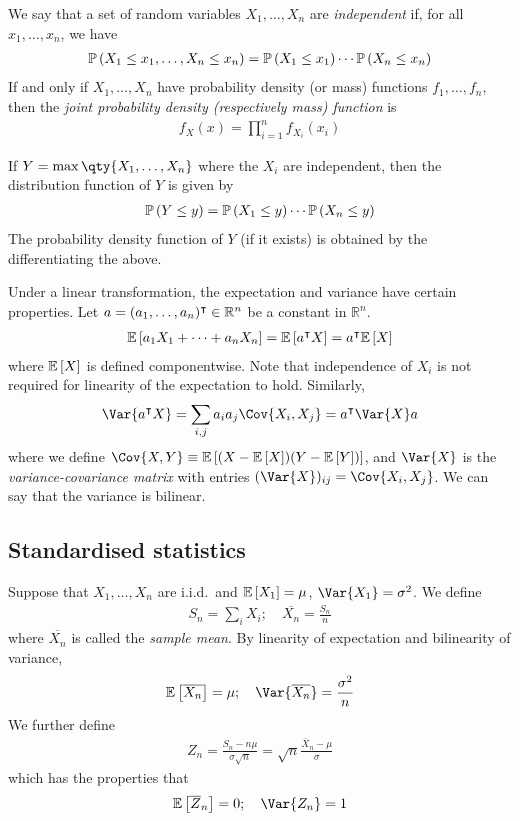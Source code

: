 We say that a set of random variables $X_1, \dots, X_n$ are \textit{independent} if, for all $x_1, \dots, x_n$, we have
\begin{align*}
	\mathbb{P}\left({X_1 \leq x_1, \dots, X_n \leq x_n}\right) = \mathbb{P}\left({X_1 \leq x_1}\right) \cdots \mathbb{P}\left({X_n \leq x_n}\right)
\end{align*}
If and only if $X_1, \dots, X_n$ have probability density (or mass) functions $f_1, \dots, f_n$, then the \textit{joint probability density (respectively mass) function} is
\begin{align*}
	f_X(x) = \prod_{i = 1}^n f_{X_i}(x_i)
\end{align*}

If $Y = \max\qty{X_1, \dots, X_n}$ where the $X_i$ are independent, then the distribution function of $Y$ is given by
\begin{align*}
	\mathbb{P}\left({Y \leq y}\right) = \mathbb{P}\left({X_1 \leq y}\right) \cdots \mathbb{P}\left({X_n \leq y}\right)
\end{align*}
The probability density function of $Y$ (if it exists) is obtained by the differentiating the above.

Under a linear transformation, the expectation and variance have certain properties.
Let $a = (a_1, \dots, a_n)^\intercal \in \mathbb R^n$ be a constant in $\mathbb R^n$.
\begin{align*}
	\mathbb{E}\left[{a_1 X_1 + \dots + a_n X_n}\right] = \mathbb{E}\left[{a^\intercal X}\right] = a^\intercal \mathbb{E}\left[{X}\right]
\end{align*}
where $\mathbb{E}\left[{X}\right]$ is defined componentwise.
Note that independence of $X_i$ is not required for linearity of the expectation to hold.
Similarly,
\begin{align*}
	\Var{a^\tran X} = \sum_{i,j} a_i a_j \Cov{X_i, X_j} = a^\tran \Var{X} a
\end{align*}
where we define $\Cov{X, Y} \equiv \expect{(X - \expect{X})(Y - \expect{Y})}$, and $\Var{X}$ is the \textit{variance-covariance matrix} with entries $(\Var{X})_{ij} = \Cov{X_i, X_j}$.
We can say that the variance is bilinear.

\subsection{Standardised statistics}
Suppose that $X_1, \dots, X_n$ are i.i.d.\ and $\mathbb{E}\left[{X_1}\right] = \mu$, $\Var{X_1} = \sigma^2$.
We define
\begin{align*}
	S_n = \sum_i X_i;\quad \overline{X_n} = \frac{S_n}{n}
\end{align*}
where $\overline{X_n}$ is called the \textit{sample mean}.
By linearity of expectation and bilinearity of variance,
\begin{align*}
	\expect{\overline{X_n}} = \mu;\quad \Var{\overline {X_n}} = \frac{\sigma^2}{n}
\end{align*}
We further define
\begin{align*}
	Z_n = \frac{S_n - n\mu}{\sigma\sqrt{n}} = \sqrt{n} \frac{\overline X_n - \mu}{\sigma}
\end{align*}
which has the properties that
\begin{align*}
	\expect{\overline Z_n} = 0;\quad \Var{Z_n} = 1
\end{align*}

